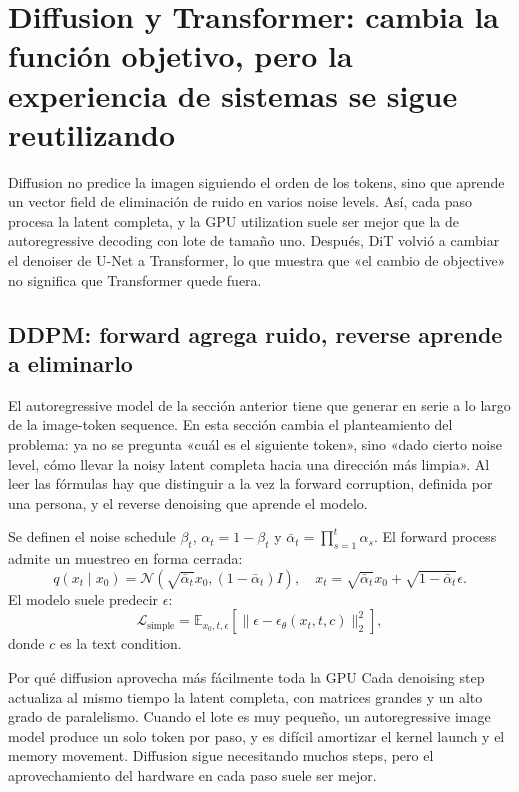 \section{Diffusion y Transformer: cambia la función objetivo, pero la experiencia de sistemas se sigue reutilizando}

Diffusion no predice la imagen siguiendo el orden de los tokens, sino que aprende un vector field de eliminación de ruido en varios noise levels. Así, cada paso procesa la latent completa, y la GPU utilization suele ser mejor que la de autoregressive decoding con lote de tamaño uno. Después, DiT volvió a cambiar el denoiser de U-Net a Transformer, lo que muestra que «el cambio de objective» no significa que Transformer quede fuera.

\subsection{DDPM: forward agrega ruido, reverse aprende a eliminarlo}

El autoregressive model de la sección anterior tiene que generar en serie a lo largo de la image-token sequence. En esta sección cambia el planteamiento del problema: ya no se pregunta «cuál es el siguiente token», sino «dado cierto noise level, cómo llevar la noisy latent completa hacia una dirección más limpia». Al leer las fórmulas hay que distinguir a la vez la forward corruption, definida por una persona, y el reverse denoising que aprende el modelo.

Se definen el noise schedule $\beta_t$, $\alpha_t=1-\beta_t$ y $\bar\alpha_t=\prod_{s=1}^{t}\alpha_s$. El forward process admite un muestreo en forma cerrada:
\[
q(x_t\mid x_0)=\mathcal{N}\!\left(\sqrt{\bar\alpha_t}x_0,(1-\bar\alpha_t)I\right),
\quad
x_t=\sqrt{\bar\alpha_t}x_0+\sqrt{1-\bar\alpha_t}\epsilon.
\]
El modelo suele predecir $\epsilon$:
\[
\mathcal{L}_{\text{simple}}=\mathbb{E}_{x_0,t,\epsilon}
\left[\|\epsilon-\epsilon_\theta(x_t,t,c)\|_2^2\right],
\]
donde $c$ es la text condition.


\begin{knowledgebox}{Por qué diffusion aprovecha más fácilmente toda la GPU}
Cada denoising step actualiza al mismo tiempo la latent completa, con matrices grandes y un alto grado de paralelismo. Cuando el lote es muy pequeño, un autoregressive image model produce un solo token por paso, y es difícil amortizar el kernel launch y el memory movement. Diffusion sigue necesitando muchos steps, pero el aprovechamiento del hardware en cada paso suele ser mejor.
\end{knowledgebox}

